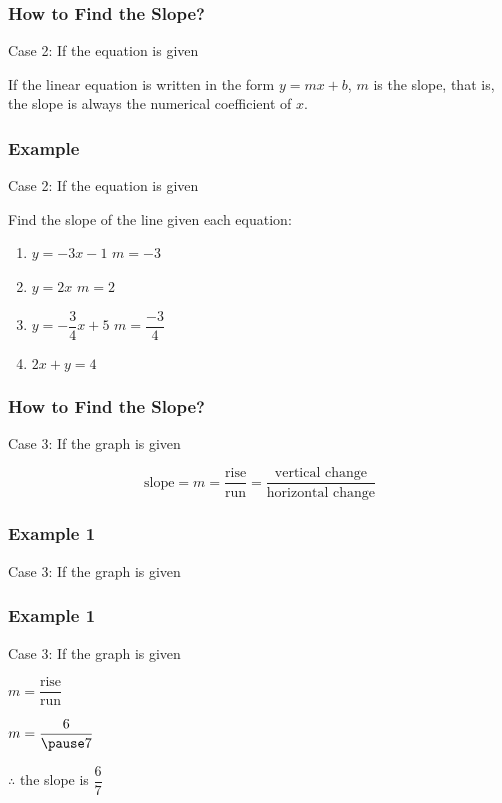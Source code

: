 \documentclass[14pt]{beamer}
\begin{document}
    \begin{frame}
    	\frametitle{How to Find the Slope?}
    	Case 2: If the equation is given
    	
    	\vone
    	
    	If the linear equation is written in the form $ y = mx + b $, $ m $ is the slope, that is, the slope is always the numerical coefficient of $ x$. 
    
    \end{frame}

    \begin{frame}
    	\frametitle{Example}
    	Case 2: If the equation is given
    	
    	\vone
    	
        Find the slope of the line given each equation:
        \begin{enumerate}
        	\item \pause $ y = -3x - 1 $ \pause \void $ m = -3 $
        	\item \pause $ y = 2x $ \pause \void $ m = 2 $
        	\item \pause $ y = -\dfrac{3}{4}x + 5 $ \pause \void $ m = \dfrac{-3}{4} $
        	\item \pause $ 2x + y = 4 $ 
        \end{enumerate}
    	\pause {}
    \end{frame}

    \begin{frame}
    	\frametitle{How to Find the Slope?}
    	Case 3: If the graph is given
    	
    	\vone
    	
    	\[ \text{slope} = m = \dfrac{\text{rise}}{\text{run}} = \dfrac{\text{vertical change}}{\text{horizontal change}} \]
    	
    \end{frame}

    \begin{frame}
    	\frametitle{Example 1}
    	Case 3: If the graph is given
    	
    \end{frame}

    \begin{frame}
    	\frametitle{Example 1}
    	Case 3: If the graph is given
    	
    	\vone $ m = \dfrac{\text{rise}}{\text{run}} $
    	
    	\pause \vone $ m = \dfrac{6}{\pause 7} $
    	
    	\pause \vone $ \therefore $ the slope is $ \dfrac{6}{7} $
    \end{frame}
\end{document}
